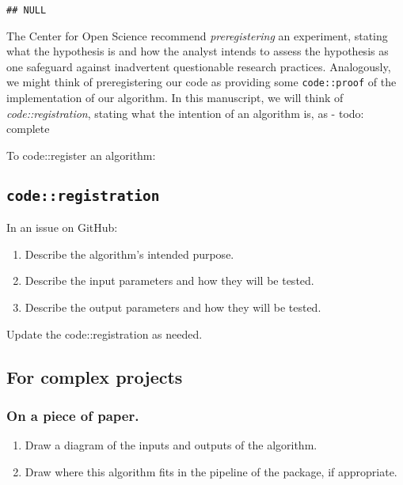 \documentclass[
]{article}
\providecommand{\tightlist}{%
  \setlength{\itemsep}{0pt}\setlength{\parskip}{0pt}}
\begin{document}
\begin{verbatim}
## NULL
\end{verbatim}

The Center for Open Science recommend \emph{preregistering} an
experiment, stating what the hypothesis is and how the analyst intends
to assess the hypothesis as one safeguard against inadvertent
questionable research practices. Analogously, we might think of
preregistering our code as providing some \texttt{code::proof} of the
implementation of our algorithm. In this manuscript, we will think of
\emph{code::registration}, stating what the intention of an algorithm
is, as - todo: complete

To code::register an algorithm:

\hypertarget{coderegistration}{%
\subsection{\texorpdfstring{\texttt{code::registration}}{code::registration}}\label{coderegistration}}

In an issue on GitHub:

\begin{enumerate}
\def\labelenumi{\arabic{enumi}.}
\tightlist
\item
  Describe the algorithm's intended purpose.
\item
  Describe the input parameters and how they will be tested.
\item
  Describe the output parameters and how they will be tested.
\end{enumerate}

Update the code::registration as needed.

\hypertarget{for-complex-projects}{%
\subsection{For complex projects}\label{for-complex-projects}}

\hypertarget{on-a-piece-of-paper.}{%
\subsubsection{On a piece of paper.}\label{on-a-piece-of-paper.}}

\begin{enumerate}
\def\labelenumi{\arabic{enumi}.}
\tightlist
\item
  Draw a diagram of the inputs and outputs of the algorithm.
\item
  Draw where this algorithm fits in the pipeline of the package, if
  appropriate.
\end{enumerate}
\end{document}

